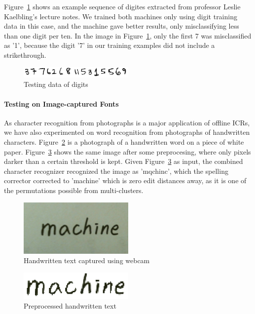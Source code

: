 \documentclass[12pt]{article}
\begin{document}
	Figure~\ref{figure:number} shows an example sequence of digites extracted from professor Leslie Kaelbling's lecture notes. We trained both machines only using digit training data in this case, and the machine gave better results, only misclassifying less than one digit per ten. In the image in Figure~\ref{figure:number}, only the first 7 was misclassified as '1', because the digit '7' in our training examples did not include a strikethrough.
	
	\begin{figure}[htbp!]
	\centering
	\includegraphics[width=0.5\textwidth]{number.eps}
	\caption{Testing data of digits}
	\label{figure:number}
	\end{figure}
	
	\paragraph{Testing on Image-captured Fonts} As character recognition from photographs is a major application of offline ICRs, we have also experimented on word recognition from photographs of handwritten characters. Figure~\ref{figure:machine_camb} is a photograph of a handwritten word on a piece of white paper. Figure~\ref{figure:machine_cam} shows the same image after some preprocesing, where only pixels darker than a certain threshold is kept. Given Figure~\ref{figure:machine_cam} as input, the combined character recognizer recognized the image as 'mqchinc', which the spelling corrector corrected to 'machine' which is zero edit distances away, as it is one of the permutations possible from multi-clusters.
	
	
	\begin{figure}[htbp!]
	\centering
	\includegraphics[width=0.5\textwidth]{machine_camb.eps}
	\caption{Handwritten text captured using webcam}
	\label{figure:machine_camb}
	\end{figure}
	
	\begin{figure}[htbp!]
	\centering
	\includegraphics[width=0.5\textwidth]{machine_cam.eps}
	\caption{Preprocessed handwritten text}
	\label{figure:machine_cam}
	\end{figure}
	
\end{document}
